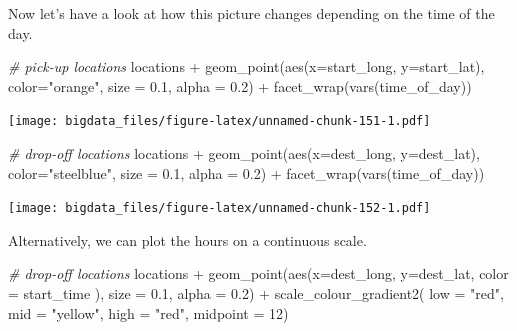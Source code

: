\documentclass[
  12pt,
]{style/krantz}
\newenvironment{Shaded}{\begin{snugshade}}{\end{snugshade}}
\newcommand{\AttributeTok}[1]{\textcolor[rgb]{0.77,0.63,0.00}{#1}}
\newcommand{\CommentTok}[1]{\textcolor[rgb]{0.56,0.35,0.01}{\textit{#1}}}
\newcommand{\DecValTok}[1]{\textcolor[rgb]{0.00,0.00,0.81}{#1}}
\newcommand{\FloatTok}[1]{\textcolor[rgb]{0.00,0.00,0.81}{#1}}
\newcommand{\FunctionTok}[1]{\textcolor[rgb]{0.00,0.00,0.00}{#1}}
\newcommand{\NormalTok}[1]{#1}
\newcommand{\SpecialCharTok}[1]{\textcolor[rgb]{0.00,0.00,0.00}{#1}}
\newcommand{\StringTok}[1]{\textcolor[rgb]{0.31,0.60,0.02}{#1}}
\begin{document}
Now let's have a look at how this picture changes depending on the time of the day.

\begin{Shaded}
\begin{Highlighting}[]
\CommentTok{\# pick{-}up locations }
\NormalTok{locations }\SpecialCharTok{+}
     \FunctionTok{geom\_point}\NormalTok{(}\FunctionTok{aes}\NormalTok{(}\AttributeTok{x=}\NormalTok{start\_long, }\AttributeTok{y=}\NormalTok{start\_lat),}
                \AttributeTok{color=}\StringTok{"orange"}\NormalTok{,}
                \AttributeTok{size =} \FloatTok{0.1}\NormalTok{,}
                \AttributeTok{alpha =} \FloatTok{0.2}\NormalTok{) }\SpecialCharTok{+}
     \FunctionTok{facet\_wrap}\NormalTok{(}\FunctionTok{vars}\NormalTok{(time\_of\_day))}
\end{Highlighting}
\end{Shaded}

\texttt{[image: bigdata\_files/figure-latex/unnamed-chunk-151-1.pdf]}

\begin{Shaded}
\begin{Highlighting}[]
\CommentTok{\# drop{-}off locations }
\NormalTok{locations }\SpecialCharTok{+}
     \FunctionTok{geom\_point}\NormalTok{(}\FunctionTok{aes}\NormalTok{(}\AttributeTok{x=}\NormalTok{dest\_long, }\AttributeTok{y=}\NormalTok{dest\_lat),}
                \AttributeTok{color=}\StringTok{"steelblue"}\NormalTok{,}
                \AttributeTok{size =} \FloatTok{0.1}\NormalTok{,}
                \AttributeTok{alpha =} \FloatTok{0.2}\NormalTok{) }\SpecialCharTok{+}
     \FunctionTok{facet\_wrap}\NormalTok{(}\FunctionTok{vars}\NormalTok{(time\_of\_day))}
\end{Highlighting}
\end{Shaded}

\texttt{[image: bigdata\_files/figure-latex/unnamed-chunk-152-1.pdf]}

Alternatively, we can plot the hours on a continuous scale.

\begin{Shaded}
\begin{Highlighting}[]
\CommentTok{\# drop{-}off locations }
\NormalTok{locations }\SpecialCharTok{+}
     \FunctionTok{geom\_point}\NormalTok{(}\FunctionTok{aes}\NormalTok{(}\AttributeTok{x=}\NormalTok{dest\_long, }\AttributeTok{y=}\NormalTok{dest\_lat, }\AttributeTok{color =}\NormalTok{ start\_time ),}
                \AttributeTok{size =} \FloatTok{0.1}\NormalTok{,}
                \AttributeTok{alpha =} \FloatTok{0.2}\NormalTok{) }\SpecialCharTok{+}
     \FunctionTok{scale\_colour\_gradient2}\NormalTok{( }\AttributeTok{low =} \StringTok{"red"}\NormalTok{, }\AttributeTok{mid =} \StringTok{"yellow"}\NormalTok{, }\AttributeTok{high =} \StringTok{"red"}\NormalTok{,}
                             \AttributeTok{midpoint =} \DecValTok{12}\NormalTok{)}
\end{Highlighting}
\end{Shaded}
\end{document}
